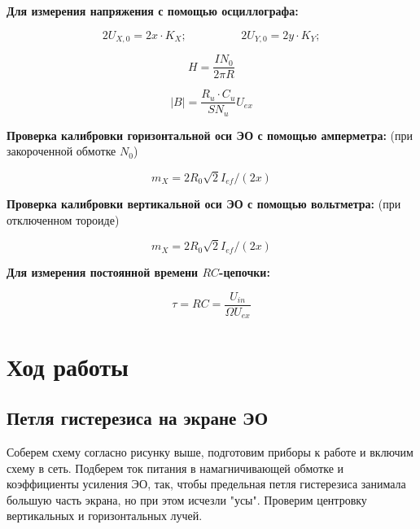 \textbf{Для измерения напряжения с помощью осциллографа:}

\begin{equation}\label{}
    2U_{X,0}=2x\cdot K_X; \hspace{2cm} 2U_{Y,0}=2y\cdot K_Y;
\end{equation}

\begin{equation}\label{}
    H=\frac{IN_0}{2\pi R}
\end{equation}

\begin{equation}\label{}
    |B|=\frac{R_u \cdot C_u}{SN_u}U_{ex}
\end{equation}


\textbf{Проверка калибровки горизонтальной оси ЭО с помощью амперметра:} (при закороченной обмотке $N_0$) 


\begin{equation}\label{}
    m_X=2R_0\sqrt{2}I_{ef}/(2x) 
\end{equation}

\textbf{Проверка калибровки вертикальной оси ЭО с помощью вольтметра:} (при отключенном тороиде)


\begin{equation}\label{}
    m_X=2R_0\sqrt{2}I_{ef}/(2x) 
\end{equation}


\textbf{Для измерения постоянной времени $RC$-цепочки:}

\begin{equation}\label{}
    \tau=RC=\frac{U_{in}}{\Omega U_{ex}}
\end{equation}


\bigskip


\section{Ход работы}

\subsection{Петля гистерезиса на экране ЭО}


Соберем схему согласно рисунку выше, подготовим приборы к работе и включим схему в сеть. Подберем ток питания в намагничивающей обмотке и коэффициенты усиления ЭО, так, чтобы предельная петля гистерезиса занимала большую часть экрана, но при этом исчезли "усы". Проверим центровку вертикальных и горизонтальных лучей.

